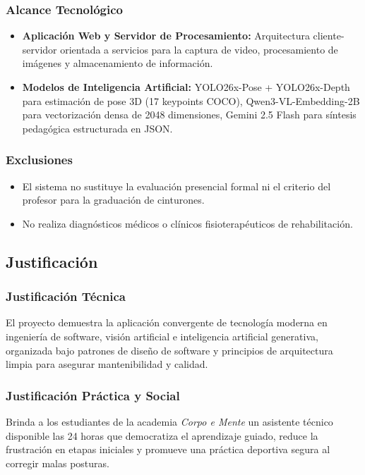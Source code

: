 \subsubsection{Alcance Tecnológico}
\begin{itemize}
    \item \textbf{Aplicación Web y Servidor de Procesamiento:} Arquitectura cliente-servidor orientada a servicios para la captura de video, procesamiento de imágenes y almacenamiento de información.
    \item \textbf{Modelos de Inteligencia Artificial:} YOLO26x-Pose + YOLO26x-Depth para estimación de pose 3D (17 keypoints COCO), Qwen3-VL-Embedding-2B para vectorización densa de 2048 dimensiones, Gemini 2.5 Flash para síntesis pedagógica estructurada en JSON.
\end{itemize}

\subsubsection{Exclusiones}
\begin{itemize}
    \item El sistema no sustituye la evaluación presencial formal ni el criterio del profesor para la graduación de cinturones.
    \item No realiza diagnósticos médicos o clínicos fisioterapéuticos de rehabilitación.
\end{itemize}

\subsection{Justificación}

\subsubsection{Justificación Técnica}
El proyecto demuestra la aplicación convergente de tecnología moderna en ingeniería de software, visión artificial e inteligencia artificial generativa, organizada bajo patrones de diseño de software y principios de arquitectura limpia para asegurar mantenibilidad y calidad.

\subsubsection{Justificación Práctica y Social}
Brinda a los estudiantes de la academia \textit{Corpo e Mente} un asistente técnico disponible las 24 horas que democratiza el aprendizaje guiado, reduce la frustración en etapas iniciales y promueve una práctica deportiva segura al corregir malas posturas.


